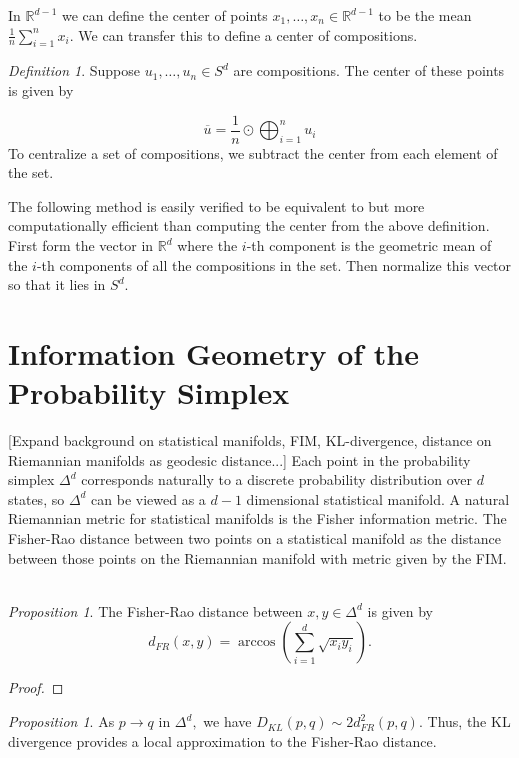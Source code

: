 \documentclass[BSc]{usydthesis}
\numberwithin{equation}{chapter}
\theoremstyle{remark}
\newtheorem{Definition}[equation]{Definition}
\newtheorem{Proposition}[equation]{Proposition}
\begin{document}
In $\mathbb{R}^{d-1}$ we can define the center of points $x_1,\ldots, x_n \in \mathbb{R}^{d-1}$ to be the mean $\frac{1}{n} \sum_{i=1}^n x_i.$ We can transfer this to define a center of compositions.

\begin{Definition}
 Suppose $u_1, \ldots, u_n \in S^d$ are compositions. The center of these points is given by 
 
$$ \overline{u} = \frac{1}{n} \odot \bigoplus_{i=1}^n u_i$$
To centralize a set of compositions, we subtract the center from each element of the set. 
\end{Definition}

The following method is easily verified to be equivalent to but more computationally efficient than computing the center from the above definition. First form the vector in $\mathbb{R}^d$ where the $i$-th component is the geometric mean of the $i$-th components of all the compositions in the set. Then normalize this vector so that it lies in $S^d.$ 


\section{Information Geometry of the Probability Simplex}
[Expand background on statistical manifolds, FIM, KL-divergence, distance on Riemannian manifolds as geodesic distance...]
Each point in the probability simplex $\Delta^d$ corresponds naturally to a discrete probability distribution over $d$ states, so $\Delta^d$ can be viewed as a $d-1$ dimensional statistical manifold. A natural Riemannian metric for statistical manifolds is the Fisher information metric. The Fisher-Rao distance between two points on a statistical manifold as the distance between those points on the Riemannian manifold with metric given by the FIM. \
\\
\begin{Proposition}
The Fisher-Rao distance between $x,y \in \Delta^d$ is given by $$d_{FR}(x,y) = \arccos \left( \sum_{i=1}^d \sqrt{x_i y_i} \right).$$
\end{Proposition}

\begin{proof}
\end{proof}

\begin{Proposition}
As $p \to q$ in $\Delta^d,$ we have $D_{KL}(p, q) \sim 2 d_{FR}^2 (p,q).$ Thus, the KL divergence provides a local approximation to the Fisher-Rao distance.
\end{Proposition}
\end{document}
